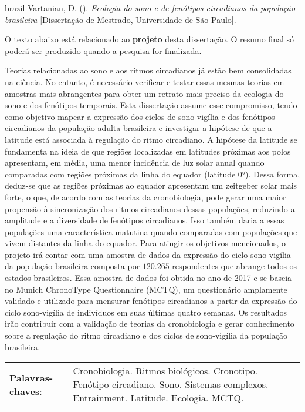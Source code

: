 
\begin{resumoenv}[\resumoestrangeironame]
\begin{otherlanguage*}{brazil}
Vartanian, D. ({\imprimirdata}). \textit{Ecologia do sono e de fenótipos circadianos da população brasileira} [Dissertação de Mestrado, Universidade de São Paulo].


O texto abaixo está relacionado ao \textbf{projeto} desta dissertação. O
resumo final só poderá ser produzido quando a pesquisa for finalizada.

Teorias relacionadas ao sono e aos ritmos circadianos já estão bem
consolidadas na ciência. No entanto, é necessário verificar e testar
essas mesmas teorias em amostras mais abrangentes para obter um retrato
mais preciso da ecologia do sono e dos fenótipos temporais. Esta
dissertação assume esse compromisso, tendo como objetivo mapear a
expressão dos ciclos de sono-vigília e dos fenótipos circadianos da
população adulta brasileira e investigar a hipótese de que a latitude
está associada à regulação do ritmo circadiano. A hipótese da latitude
se fundamenta na ideia de que regiões localizadas em latitudes próximas
aos polos apresentam, em média, uma menor incidência de luz solar anual
quando comparadas com regiões próximas da linha do equador (latitude
0°). Dessa forma, deduz-se que as regiões próximas ao equador apresentam
um zeitgeber solar mais forte, o que, de acordo com as teorias da
cronobiologia, pode gerar uma maior propensão à sincronização dos ritmos
circadianos dessas populações, reduzindo a amplitude e a diversidade de
fenótipos circadianos. Isso também daria a essas populações uma
característica matutina quando comparadas com populações que vivem
distantes da linha do equador. Para atingir os objetivos mencionados, o
projeto irá contar com uma amostra de dados da expressão do ciclo
sono-vigília da população brasileira composta por \(120.265\)
respondentes que abrange todos os estados brasileiros. Essa amostra de
dados foi obtida no ano de 2017 e se baseia no Munich ChronoType
Questionnaire (MCTQ), um questionário amplamente validado e utilizado
para mensurar fenótipos circadianos a partir da expressão do ciclo
sono-vigília de indivíduos em suas últimas quatro semanas. Os resultados
irão contribuir com a validação de teorias da cronobiologia e gerar
conhecimento sobre a regulação do ritmo circadiano e dos ciclos de
sono-vigília da população brasileira.


\begin{tabular}{p{3.6cm} p{12.3cm}}
  \textbf{Palavras-chaves}: &  Cronobiologia. Ritmos biológicos. Cronotipo. Fenótipo circadiano. Sono. Sistemas complexos. Entrainment. Latitude. Ecologia. MCTQ.
\end{tabular}
\end{otherlanguage*}
\end{resumoenv}
